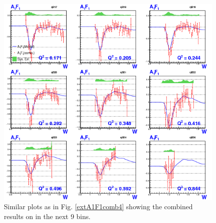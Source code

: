 \begin{figure}[H] %
  \centering
  \leavevmode \includegraphics[width=1.0\textwidth]{figuresEG4/FigResults/combinedA1F1_C71S181EbBothNoQeWbins70NwPd3.png} 
  \caption[Combined $A_1 F_1$ (in next 9 \qsqs bins)]{Similar plots as in Fig. \ref{extA1F1comb4} showing the combined results on \gones in the next 9 \qsqs bins.}
  \label{extA1F1comb3}  
\end{figure}




